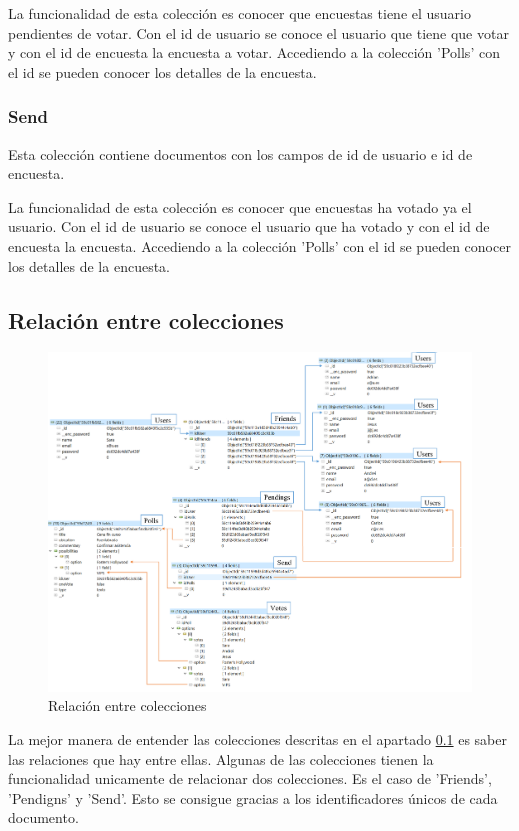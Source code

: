 \documentclass[a4paper, 12pt]{book}
\begin{document}
La funcionalidad de esta colecci\'on es conocer que encuestas tiene el usuario pendientes de votar. Con el id de usuario se conoce el usuario que tiene que votar y con el id de encuesta la encuesta a votar. Accediendo a la colecci\'on 'Polls' con el id se pueden conocer los detalles de la encuesta.

\subsubsection{Send} 
\label{sec:c_send}

Esta colecci\'on contiene documentos con los campos de id de usuario e id de encuesta.

La funcionalidad de esta colecci\'on es conocer que encuestas ha votado ya el usuario. Con el id de usuario se conoce el usuario que ha votado y con el id de encuesta la encuesta. Accediendo a la colecci\'on 'Polls' con el id se pueden conocer los detalles de la encuesta.


\subsection{Relaci\'on entre colecciones} 
\label{sec:colecciones}

\begin{figure}[H]
  \centering
  \includegraphics[width=18.5cm, keepaspectratio]{img/base_datos.png}
  \caption{Relaci\'on entre colecciones}
  \label{f:}
\end{figure}

La mejor manera de entender las colecciones descritas en el apartado \ref{sec:colecciones} es saber las relaciones que hay entre ellas. Algunas de las colecciones tienen la funcionalidad unicamente de relacionar dos colecciones. Es el caso de 'Friends', 'Pendigns' y 'Send'. Esto se consigue gracias a los identificadores \'unicos de cada documento.
\end{document}
